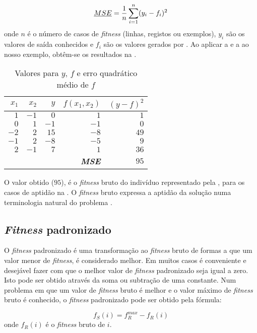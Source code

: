 \begin{equation}
\emph{MSE} = \frac{1}{n}\sum_{i=1}^{n} (y_i-f_i)^2
\label{Equacao241}
\end{equation}
\noindent onde $n$ é o número de casos de \emph{fitness} (linhas, registos ou exemplos), $y_i$ são os valores de saída conhecidos e $f_i$ são os valores 
gerados por . Ao aplicar a  e a  ao nosso exemplo, obtêm-se os resultados na .

\begin{table}[H]
    \begin{tabular}{rrrrr}%
    \toprule
    $x_1$ 	&	$x_2$	&	$y$		&	$f(x_1,x_2)$	& 	$(y-f)^2$\\
    \midrule
    $1$		&	$-1$	&	$0$		&	$1$				&	$1$\\ 
    $0$		&	$1$		&	$-1$	&	$-1$			&	$0$\\ 
   	$-2$	&	$2$		&	$15$	&	$-8$			&	$49$\\ 
    $-1$	&	$2$		&	$-8$	&	$-5$			&	$9$\\ 
    $2$		&	$-1$	&	$7$		&	$1$				&	$36$\\
    		&			&	~		&	\textbf{\emph{MSE}}	&	$95$\\  
    \bottomrule %
    \end{tabular} %
    \centering
    \caption{Valores para $y$, $f$ e erro quadrático médio de $f$}
    \label{Tabela242}
\end{table}

O valor obtido ($95$), é o \emph{fitness} bruto do indivíduo representado pela ,  para os casos de aptidão na . 
O \emph{fitness} bruto expressa a aptidão da solução numa terminologia natural do problema \citep{Koza1992}.

\subsection{\emph{Fitness} padronizado}

O \emph{fitness} padronizado é uma transformação ao \emph{fitness} bruto de formas a que um valor menor de \emph{fitness}, é considerado melhor.
Em muitos casos é conveniente e desejável fazer com que o melhor valor de \emph{fitness} padronizado seja igual a zero. Isto pode ser obtido através da
soma ou subtração de uma constante. Num problema em que um valor de \emph{fitness} bruto é melhor e o valor máximo de \emph{fitness} bruto é conhecido,
o \emph{fitness} padronizado pode ser obtido pela fórmula:

\begin{equation}
f_S(i)=f^{max}_R - f_R(i)
\label{Equacao242}
\end{equation}
\noindent onde $f_R(i)$ é o \emph{fitness} bruto de $i$.